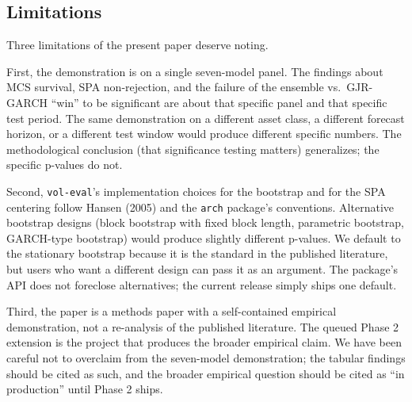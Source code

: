 \subsection{Limitations}

Three limitations of the present paper deserve noting.

First, the demonstration is on a single seven-model panel. The findings about MCS survival, SPA non-rejection, and the failure of the ensemble vs.\ GJR-GARCH ``win'' to be significant are about that specific panel and that specific test period. The same demonstration on a different asset class, a different forecast horizon, or a different test window would produce different specific numbers. The methodological conclusion (that significance testing matters) generalizes; the specific p-values do not.

Second, \texttt{vol-eval}'s implementation choices for the bootstrap and for the SPA centering follow Hansen (2005) and the \texttt{arch} package's conventions. Alternative bootstrap designs (block bootstrap with fixed block length, parametric bootstrap, GARCH-type bootstrap) would produce slightly different p-values. We default to the stationary bootstrap because it is the standard in the published literature, but users who want a different design can pass it as an argument. The package's API does not foreclose alternatives; the current release simply ships one default.

Third, the paper is a methods paper with a self-contained empirical demonstration, not a re-analysis of the published literature. The queued Phase 2 extension is the project that produces the broader empirical claim. We have been careful not to overclaim from the seven-model demonstration; the tabular findings should be cited as such, and the broader empirical question should be cited as ``in production'' until Phase 2 ships.
